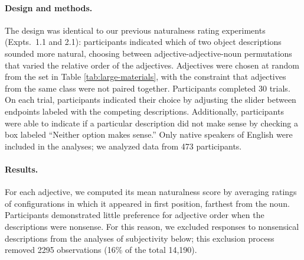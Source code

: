 \documentclass[manuscript]{stjour}
\begin{document}
\paragraph{Design and methods.}

The design was identical to our previous naturalness rating experiments (Expts.~1.1 and 2.1): participants indicated which of two object descriptions sounded more natural, choosing between adjective-adjective-noun permutations that varied the relative order of the adjectives. Adjectives were chosen at random from the set in Table \ref{tab:large-materials}, with the constraint that adjectives from the same class were not paired together.
%
Participants completed 30 trials. On each trial, participants indicated their choice by adjusting the slider between endpoints labeled with the competing descriptions. Additionally, participants were able to indicate if a particular description did not make sense by checking a box labeled ``Neither option makes sense.'' Only native speakers of English 
were included in the analyses; we analyzed data from 473 participants.

\paragraph{Results.}


For each adjective, we computed its mean naturalness score by averaging ratings of configurations in which it appeared in first position, farthest from the noun. Participants demonstrated little preference for adjective order when the descriptions were nonsense. For this reason, we excluded responses to nonsensical descriptions from the analyses of subjectivity below; this exclusion process removed 2295 observations (16\% of the total 14,190).  %
\end{document}
